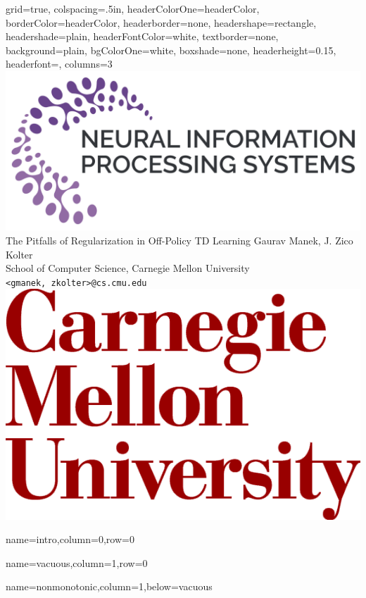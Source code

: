 \documentclass[landscape,paperwidth=96in,paperheight=48in,fontscale=0.2]{baposter}
\begin{document}
\begin{poster}{
    grid=true,
    colspacing=.5in,
    headerColorOne=headerColor, borderColor=headerColor,
    headerborder=none, headershape=rectangle,
    headershade=plain, headerFontColor=white, textborder=none,
    background=plain, bgColorOne=white, boxshade=none,
    headerheight=0.15\textheight,
    headerfont=\headerfont,
    columns=3
  }{
    \includegraphics[height=0.11\textheight]{images/neurips-logo}
  }{
    {{\titlefont The Pitfalls of Regularization in Off-Policy TD Learning }}
  }{\vspace{2mm}\large
    Gaurav Manek, J. Zico Kolter \\
    School of Computer Science, Carnegie Mellon University \\
    \texttt{<gmanek, zkolter>@cs.cmu.edu}
  }{\includegraphics[height=0.11\textheight]{images/cmu-logo}}

  {name=intro,column=0,row=0}{}

  {name=vacuous,column=1,row=0}{}

  {name=nonmonotonic,column=1,below=vacuous}{}




\end{poster}
\end{document}
